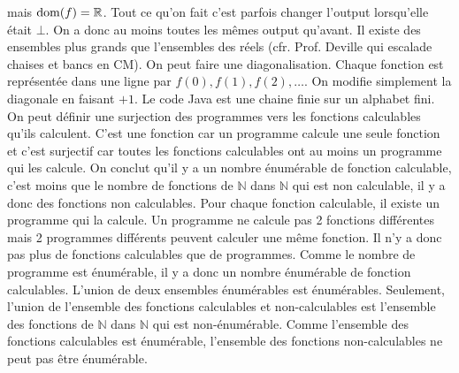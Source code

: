 \begin{mcqs}
{  mais $\mathop{\mathrm{dom}}(f) = \mathbb{R}$.}
  {Tout ce qu'on fait c'est parfois changer l'output lorsqu'elle était $\bot$. On a donc au moins toutes les mêmes output qu'avant.}
  {Il existe des ensembles plus grands que l'ensembles des réels (cfr. Prof. Deville qui escalade chaises et bancs en CM).}
  {On peut faire une diagonalisation.
  Chaque fonction est représentée dans une ligne par $f(0),f(1),f(2),\ldots$.
  On modifie simplement la diagonale en faisant $+1$.}
  {Le code Java est une chaine finie sur un alphabet fini.}
  {On peut définir une surjection des programmes vers les fonctions calculables qu'ils calculent.
  C'est une fonction car un programme calcule une seule fonction et c'est surjectif car toutes les fonctions calculables
  ont au moins un programme qui les calcule.
  On conclut qu'il y a un nombre énumérable de fonction calculable, c'est moins que le nombre de fonctions de $\mathbb{N}$ dans $\mathbb{N}$
  qui est non calculable, il y a donc des fonctions non calculables.}
  {Pour chaque fonction calculable, il existe un programme qui la calcule.
  Un programme ne calcule pas 2 fonctions différentes mais 2 programmes différents peuvent calculer une même fonction.
  Il n'y a donc pas plus de fonctions calculables que de programmes.
  Comme le nombre de programme est énumérable,
  il y a donc un nombre énumérable de fonction calculables.}
  {L'union de deux ensembles énumérables est énumérables.
  Seulement, l'union de l'ensemble des fonctions calculables et non-calculables
  est l'ensemble des fonctions de $\mathbb{N}$ dans $\mathbb{N}$ qui est non-énumérable.
  Comme l'ensemble des fonctions calculables est énumérable,
  l'ensemble des fonctions non-calculables ne peut pas être énumérable.}
\end{mcqs}
